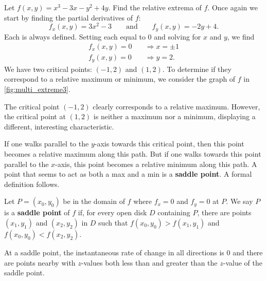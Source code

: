 \begin{example}\label{ex_multi_extreme3}
Let $f(x,y) = x^3-3x-y^2+4y$. Find the relative extrema of $f$.
\solution
Once again we start by finding the partial derivatives of $f$:
\[f_x(x,y) = 3x^2-3\qquad \text{and} \qquad f_y(x,y) = -2y+4.\]
Each is always defined. Setting each equal to 0 and solving for $x$ and $y$, we find
\begin{align*}
f_x(x,y) = 0 \quad &\Rightarrow x=\pm 1\\
f_y(x,y) = 0\quad &\Rightarrow y = 2.
\end{align*}
We have two critical points: $(-1,2)$ and $(1,2)$. To determine if they correspond to a relative maximum or minimum, we consider the graph of $f$ in \autoref{fig:multi_extreme3}.

The critical point $(-1,2)$ clearly corresponds to a relative maximum. However, the critical point at $(1,2)$ is neither a maximum nor a minimum, displaying a different, interesting characteristic. 

If one walks parallel to the $y$-axis towards this critical point, then this point becomes a relative maximum along this path. But if one walks towards this point parallel to the $x$-axis, this point becomes a relative minimum along this path. A point that seems to act as both a max and a min is a \textbf{saddle point}. A formal definition follows.
\end{example}

\begin{definition}\label{def:saddle_point}
Let $P=(x_0,y_0)$ be in the domain of $f$ where $f_x=0$ and $f_y=0$ at $P$. We say $P$ is a \textbf{saddle point} of $f$ if, for every open disk $D$ containing $P$, there are points $(x_1,y_1)$ and $(x_2,y_2)$ in $D$ such that $f(x_0,y_0)>f(x_1,y_1)$ and $f(x_0,y_0)<f(x_2,y_2)$.
\end{definition}

At a saddle point, the instantaneous rate of change in all directions is 0 and there are points nearby with $z$-values both less than and greater than the $z$-value of the saddle point.

